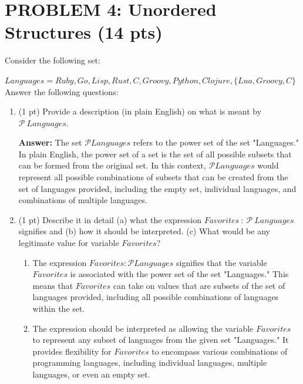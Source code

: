 \documentclass[12pt]{article}
\begin{document}
\begin{spacing}{1.5}
\begin{enumerate}
		      		      		      		        
	\end{enumerate}	    
	\newpage
	\section*{PROBLEM 4: Unordered Structures (14 pts)}
				
	Consider the following set:
			
	$Languages=Ruby, Go, Lisp, Rust, C, Groovy, Python, Clojure, \{Lua, Groovy, C\}$\\
			
	Answer the following questions:
			
	\begin{enumerate}
		\item (1 pt) Provide a description (in plain English) on what is meant by $\mathcal{P} \: Languages$.
		      		      		      
		      \textbf{Answer:} The set $\mathcal{P} Languages$ refers to the power set of the set "Languages." In plain English, the power set of a set is the set of all possible subsets that can be formed from the original set. In this context, $\mathcal{P} Languages$ would represent all possible combinations of subsets that can be created from the set of languages provided, including the empty set, individual languages, and combinations of multiple languages.\\
		      		      		      
		\item (1 pt) Describe it in detail (a) what the expression $Favorites\: : \: \mathcal{P} \: Languages$ signifies and (b) how it should be interpreted. (c) What would be any legitimate value for variable $Favorites$?
		      		      		      
		      \begin{enumerate}
		      	\item The expression $Favorites : \mathcal{P} Languages$ signifies that the variable $Favorites$ is associated with the power set of the set "Languages." This means that $Favorites$ can take on values that are subsets of the set of languages provided, including all possible combinations of languages within the set. 
		      	      		      	      		      	                      
		      	\item The expression should be interpreted as allowing the variable $Favorites$ to represent any subset of languages from the given set "Languages." It provides flexibility for $Favorites$ to encompass various combinations of programming languages, including individual languages, multiple languages, or even an empty set. 
		      	      		      	      		      	                      

\end{enumerate}
\end{enumerate}
\end{spacing}
\end{document}
